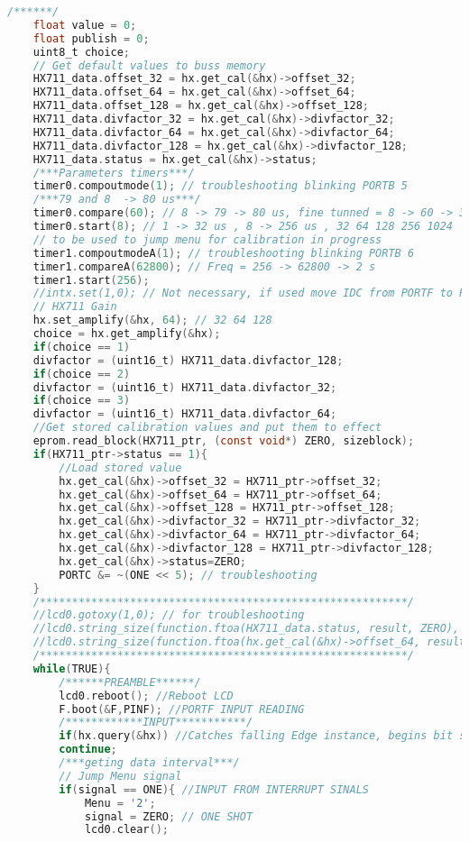 \begin{lstlisting}[language=C, caption={main.c}, label=main-c, captionpos=b]
	/******/
	float value = 0;
	float publish = 0;
	uint8_t choice;
	// Get default values to buss memory
	HX711_data.offset_32 = hx.get_cal(&hx)->offset_32;
	HX711_data.offset_64 = hx.get_cal(&hx)->offset_64;
	HX711_data.offset_128 = hx.get_cal(&hx)->offset_128;
	HX711_data.divfactor_32 = hx.get_cal(&hx)->divfactor_32;
	HX711_data.divfactor_64 = hx.get_cal(&hx)->divfactor_64;
	HX711_data.divfactor_128 = hx.get_cal(&hx)->divfactor_128;
	HX711_data.status = hx.get_cal(&hx)->status;
	/***Parameters timers***/
	timer0.compoutmode(1); // troubleshooting blinking PORTB 5
	/***79 and 8  -> 80 us***/
	timer0.compare(60); // 8 -> 79 -> 80 us, fine tunned = 8 -> 60 -> 30.4us
	timer0.start(8); // 1 -> 32 us , 8 -> 256 us , 32 64 128 256 1024
	// to be used to jump menu for calibration in progress
	timer1.compoutmodeA(1); // troubleshooting blinking PORTB 6
	timer1.compareA(62800); // Freq = 256 -> 62800 -> 2 s
	timer1.start(256);
	//intx.set(1,0); // Not necessary, if used move IDC from PORTF to PORTD with new config pinage.
	// HX711 Gain
	hx.set_amplify(&hx, 64); // 32 64 128
	choice = hx.get_amplify(&hx);
	if(choice == 1)
	divfactor = (uint16_t) HX711_data.divfactor_128;
	if(choice == 2)
	divfactor = (uint16_t) HX711_data.divfactor_32;
	if(choice == 3)
	divfactor = (uint16_t) HX711_data.divfactor_64;
	//Get stored calibration values and put them to effect
	eprom.read_block(HX711_ptr, (const void*) ZERO, sizeblock);
	if(HX711_ptr->status == 1){
		//Load stored value 
		hx.get_cal(&hx)->offset_32 = HX711_ptr->offset_32;
		hx.get_cal(&hx)->offset_64 = HX711_ptr->offset_64;
		hx.get_cal(&hx)->offset_128 = HX711_ptr->offset_128;
		hx.get_cal(&hx)->divfactor_32 = HX711_ptr->divfactor_32;
		hx.get_cal(&hx)->divfactor_64 = HX711_ptr->divfactor_64;
		hx.get_cal(&hx)->divfactor_128 = HX711_ptr->divfactor_128;
		hx.get_cal(&hx)->status=ZERO;
		PORTC &= ~(ONE << 5); // troubleshooting
	}
	/*********************************************************/
	//lcd0.gotoxy(1,0); // for troubleshooting
	//lcd0.string_size(function.ftoa(HX711_data.status, result, ZERO), 13);
	//lcd0.string_size(function.ftoa(hx.get_cal(&hx)->offset_64, result, ZERO), 13);
	/*********************************************************/
	while(TRUE){
		/******PREAMBLE******/
		lcd0.reboot(); //Reboot LCD
		F.boot(&F,PINF); //PORTF INPUT READING
		/************INPUT***********/
		if(hx.query(&hx)) //Catches falling Edge instance, begins bit shifting.
		continue;
		/***geting data interval***/
		// Jump Menu signal
		if(signal == ONE){ //INPUT FROM INTERRUPT SINALS
			Menu = '2';
			signal = ZERO; // ONE SHOT
			lcd0.clear();

\end{lstlisting}
